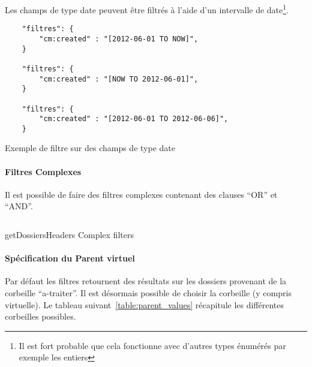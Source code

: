 Les champs de type date peuvent être filtrés à l'aide d'un intervalle de date\footnote{Il est fort probable que cela fonctionne avec d'autres types énumérés par exemple les entiers}.

\begin{codesnippet}
\begin{verbatim}
	"filtres": {
		"cm:created" : "[2012-06-01 TO NOW]",
	}
	
	"filtres": {
		"cm:created" : "[NOW TO 2012-06-01]",
	}
	
	"filtres": {
		"cm:created" : "[2012-06-01 TO 2012-06-06]",
	}
\end{verbatim}
\caption{Exemple de filtre sur des champs de type date}
\end{codesnippet}

\paragraph{Filtres Complexes}
Il est possible de faire des filtres complexes contenant des clauses ``OR'' et ``AND''.

\begin{codesnippet}
\inputminted[frame=single,linenos,fontsize=\footnotesize]{javascript}{extraits/getDossiersHeaders_search_complex_in.js}
\caption{getDossiersHeaders Complex filters}
\label{snip:getTypologie_in}
\end{codesnippet}

\paragraph{Spécification du Parent virtuel}

Par défaut les filtres retournent des résultats sur les dossiers provenant de la corbeille ``a-traiter''. Il est désormais possible de
choisir la corbeille (y compris virtuelle). Le tableau suivant~\ref{table:parent_values} récapitule les différentes corbeilles possibles.

